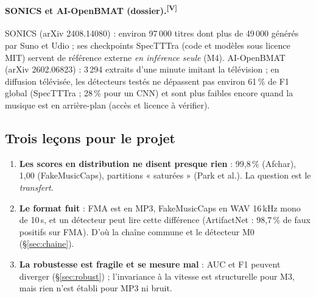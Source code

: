 \documentclass[10pt,a4paper]{article}
\newcommand{\sV}{\textsuperscript{\scriptsize\textcolor{green!40!black}{[V]}}}
\begin{document}
\paragraph{SONICS et AI-OpenBMAT (dossier).\sV}
SONICS (arXiv 2408.14080) : environ 97\,000 titres dont plus de 49\,000 générés par Suno et Udio ; ses checkpoints SpecTTTra (code et modèles sous licence MIT) servent de référence externe \emph{en inférence seule} (M4). AI-OpenBMAT (arXiv 2602.06823) : 3\,294 extraits d'une minute imitant la télévision ; en diffusion télévisée, les détecteurs testés ne dépassent pas environ 61\,\% de F1 global (SpecTTTra ; 28\,\% pour un CNN) et sont plus faibles encore quand la musique est en arrière-plan (accès et licence à vérifier).

\subsection{Trois leçons pour le projet}
\begin{enumerate}
  \item \textbf{Les scores en distribution ne disent presque rien} : 99,8\,\% (Afchar), 1,00 (FakeMusicCaps), partitions « saturées » (Park et al.). La question est le \emph{transfert}.
  \item \textbf{Le format fuit} : FMA est en MP3, FakeMusicCaps en WAV 16\,kHz mono de 10\,s, et un détecteur peut lire cette différence (ArtifactNet : 98,7\,\% de faux positifs sur FMA). D'où la chaîne commune et le détecteur M0 (§\ref{sec:chaine}).
  \item \textbf{La robustesse est fragile et se mesure mal} : AUC et F1 peuvent diverger (§\ref{sec:robust}) ; l'invariance à la vitesse est structurelle pour M3, mais rien n'est établi pour MP3 ni bruit.
\end{enumerate}
\end{document}
